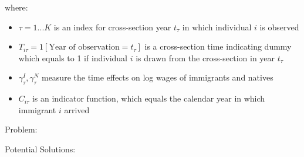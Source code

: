             where:

            \begin{itemize}
                \item $\tau=1...K$ is an index for cross-section year $t_\tau$ in which individual $i$ is observed
                \item $T_{i\tau}=1[\text{Year of observation}=t_\tau]$ is a cross-section time indicating dummy which equals to 1 if individual $i$ is drawn from the cross-section in year $t_\tau$
                \item $\gamma_{\tau}^I,\gamma_{\tau}^N$ measure the time effects on log wages of immigrants and natives
                \item $C_{i\tau}$ is an indicator function, which equals the calendar year in which immigrant $i$ arrived
            \end{itemize}

            Problem: 

            Potential Solutions:


